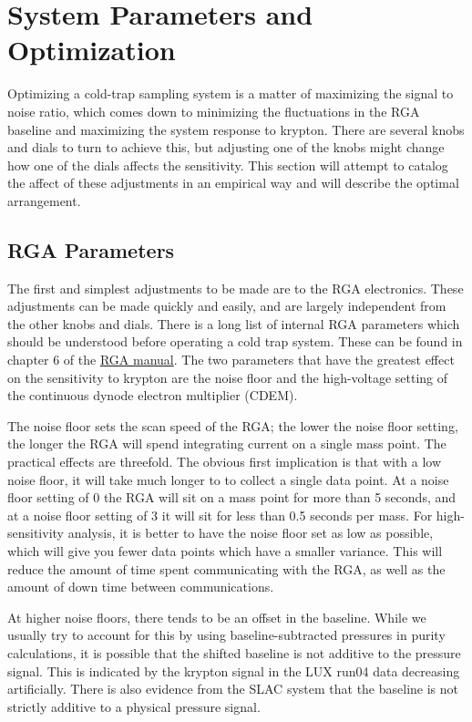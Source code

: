 \section{System Parameters and Optimization}
Optimizing a cold-trap sampling system is a matter of maximizing the signal to noise ratio, which comes down to minimizing the fluctuations in the RGA baseline and maximizing the system response to krypton. There are several knobs and dials to turn to achieve this, but adjusting one of the knobs might change how one of the dials affects the sensitivity. This section will attempt to catalog the affect of these adjustments in an empirical way and will describe the optimal arrangement.
 

\subsection{RGA Parameters} 
The first and simplest adjustments to be made are to the RGA electronics. These adjustments can be made quickly and easily, and are largely independent from the other knobs and dials. There is a long list of internal RGA parameters which should be understood before operating a cold trap system. These can be found in chapter 6 of the \href{http://www.thinksrs.com/downloads/PDFs/Manuals/RGAm.pdf}{RGA manual}. The two parameters that have the greatest effect on the sensitivity to krypton are the noise floor and the high-voltage setting of the continuous dynode electron multiplier (CDEM). 

The noise floor sets the scan speed of the RGA; the lower the noise floor setting, the longer the RGA will spend integrating current on a single mass point. The practical effects are threefold. The obvious first implication is that with a low noise floor, it will take much longer to to collect a single data point. At a noise floor setting of 0 the RGA will sit on a mass point for more than 5 seconds, and at a noise floor setting of 3 it will sit for less than 0.5 seconds per mass. For high-sensitivity analysis, it is better to have the noise floor set as low as possible, which will give you fewer data points which have a smaller variance. This will reduce the amount of time spent communicating with the RGA, as well as the amount of down time between communications. 

At higher noise floors, there tends to be an offset in the baseline. While we usually try to account for this by using baseline-subtracted pressures in purity calculations, it is possible that the shifted baseline is not additive to the pressure signal. This is indicated by the krypton signal in the LUX run04 data decreasing artificially. There is also evidence from the SLAC system that the baseline is not strictly additive to a physical pressure signal.

